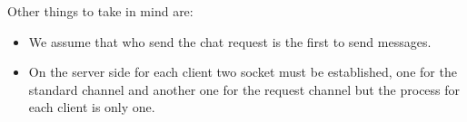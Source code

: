 \documentclass[11pt]{report}
\begin{document}
\noindent Other things to take in mind are:
\begin{itemize}
	\item We assume that who send the chat request is the first to send messages.
	\item On the server side for each client two socket must be established, one for the standard channel and another one for the request channel but the process for each client is only one.
\end{itemize}



	
	
		

	

	

\end{document}
